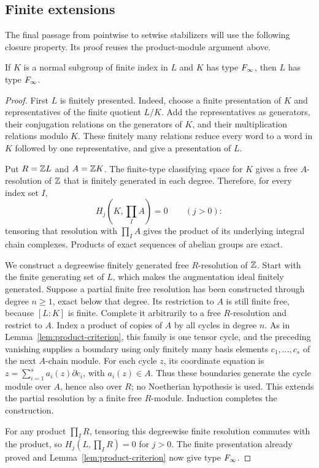 \subsection{Finite extensions}

The final passage from pointwise to setwise stabilizers will use the
following closure property.  Its proof reuses the product-module
argument above.

\begin{lemma}\label{lem:finite-extension}
If \(K\) is a normal subgroup of finite index in \(L\) and \(K\) has
type \(F_\infty\), then \(L\) has type \(F_\infty\).
\end{lemma}

\begin{proof}
First \(L\) is finitely presented. Indeed, choose a finite presentation
of \(K\) and representatives of the finite quotient \(L/K\). Add the
representatives as generators, their conjugation relations on the
generators of \(K\), and their multiplication relations modulo \(K\).
These finitely many relations reduce every word to a word in \(K\)
followed by one representative, and give a presentation of \(L\).

Put \(R=\mathbb Z L\) and \(A=\mathbb Z K\).
The finite-type classifying space for \(K\) gives a free \(A\)-resolution
of \(\mathbb Z\) that is finitely generated in each degree. Therefore, for
every index set \(I\),
\[
 H_j\left(K,\prod_I A\right)=0\qquad(j>0):
\]
tensoring that resolution with \(\prod_I A\) gives the product of its
underlying integral chain complexes. Products of exact sequences of
abelian groups are exact.

We construct a degreewise finitely generated free \(R\)-resolution of
\(\mathbb Z\). Start with the finite generating set of \(L\), which makes the
augmentation ideal finitely generated. Suppose a partial finite free
resolution has been constructed through degree \(n\geq1\), exact
below that degree. Its restriction to \(A\) is still finite free,
because \([L:K]\) is finite. Complete it arbitrarily to a free
\(R\)-resolution and restrict to \(A\). Index a product of copies of
\(A\) by all cycles in degree \(n\). As in
Lemma~\ref{lem:product-criterion}, this family is one tensor cycle, and
the preceding vanishing supplies a boundary using only finitely many
basis elements \(c_1,\ldots,c_s\) of the next \(A\)-chain module.
For each cycle \(z\), its coordinate equation is
\(z=\sum_{i=1}^s a_i(z)\partial c_i\), with \(a_i(z)\in A\).
Thus these boundaries generate the cycle module over \(A\), hence
also over \(R\); no Noetherian hypothesis is used. This
extends the partial resolution by a finite free \(R\)-module.
Induction completes the construction.

For any product \(\prod_I R\), tensoring this degreewise finite
resolution commutes with the product, so
\(H_j(L,\prod_I R)=0\) for \(j>0\).
The finite presentation already proved and
Lemma~\ref{lem:product-criterion} now give type \(F_\infty\).
\end{proof}

